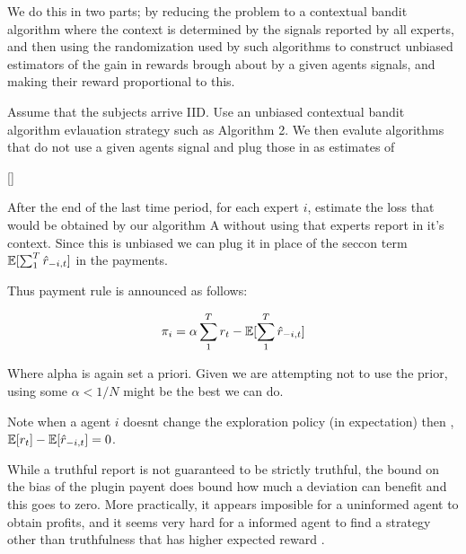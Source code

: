 We do this in two parts; by reducing the problem to a contextual bandit algorithm where the context is determined by the signals reported by all experts, and then using the randomization used by such algorithms to construct unbiased estimators of the gain in rewards brough about by a given agents signals, and making their reward proportional to this. 

Assume that the subjects arrive IID. Use an unbiased contextual bandit algorithm evlauation strategy such as \cite{li2011unbiased}  Algorithm 2. %
We then evalute algorithms that do not use a given agents signal and plug those in as estimates of 


\begin{mech}\label{mech:bandit}[]



After the end of the last time period, for each expert $i$, estimate the loss that would be obtained by our algorithm A without using that experts report in it's context. Since this is unbiased we can plug it in place of the seccon term $\operatorname*{\mathbb E}[\sum_1^T \hat{r}_{-i,t}]$ in the payments. 


Thus payment rule is announced as follows:

\[
    \pi_i =  \alpha \sum_1^T r_t -  \operatorname*{\mathbb E}[\sum_1^T \hat{r}_{-i,t}]
\]

Where alpha is again set a priori. Given we are attempting not to use the prior, using some $\alpha < 1/N$ might be the best we can do. 

\end{mech}


Note when a agent $i$ doesnt change the exploration policy (in expectation) then , $ \operatorname*{\mathbb E}[r_t] - \operatorname*{\mathbb E}[\hat{r}_{-i,t}] =0  $. 

While a truthful report is not guaranteed to be strictly truthful, the bound on the bias of the plugin payent does bound how much a deviation can benefit  and this goes to zero. More practically, it appears imposible for a uninformed agent to obtain profits, and it seems very hard for a informed agent to find a strategy other than truthfulness that has higher expected reward .


